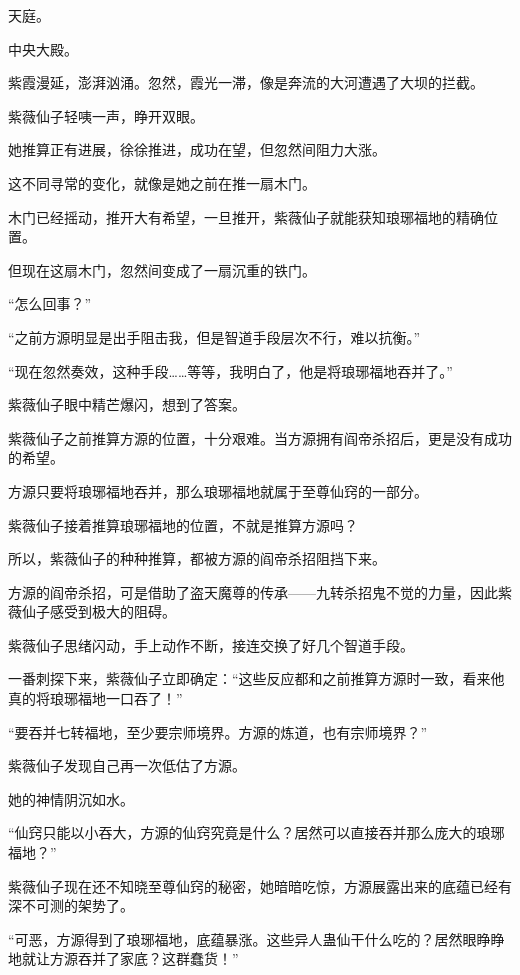 
\begin{this_body}



天庭。

中央大殿。

紫霞漫延，澎湃汹涌。忽然，霞光一滞，像是奔流的大河遭遇了大坝的拦截。

紫薇仙子轻咦一声，睁开双眼。

她推算正有进展，徐徐推进，成功在望，但忽然间阻力大涨。

这不同寻常的变化，就像是她之前在推一扇木门。

木门已经摇动，推开大有希望，一旦推开，紫薇仙子就能获知琅琊福地的精确位置。

但现在这扇木门，忽然间变成了一扇沉重的铁门。

“怎么回事？”

“之前方源明显是出手阻击我，但是智道手段层次不行，难以抗衡。”

“现在忽然奏效，这种手段……等等，我明白了，他是将琅琊福地吞并了。”

紫薇仙子眼中精芒爆闪，想到了答案。

紫薇仙子之前推算方源的位置，十分艰难。当方源拥有阎帝杀招后，更是没有成功的希望。

方源只要将琅琊福地吞并，那么琅琊福地就属于至尊仙窍的一部分。

紫薇仙子接着推算琅琊福地的位置，不就是推算方源吗？

所以，紫薇仙子的种种推算，都被方源的阎帝杀招阻挡下来。

方源的阎帝杀招，可是借助了盗天魔尊的传承——九转杀招鬼不觉的力量，因此紫薇仙子感受到极大的阻碍。

紫薇仙子思绪闪动，手上动作不断，接连交换了好几个智道手段。

一番刺探下来，紫薇仙子立即确定：“这些反应都和之前推算方源时一致，看来他真的将琅琊福地一口吞了！”

“要吞并七转福地，至少要宗师境界。方源的炼道，也有宗师境界？”

紫薇仙子发现自己再一次低估了方源。

她的神情阴沉如水。

“仙窍只能以小吞大，方源的仙窍究竟是什么？居然可以直接吞并那么庞大的琅琊福地？”

紫薇仙子现在还不知晓至尊仙窍的秘密，她暗暗吃惊，方源展露出来的底蕴已经有深不可测的架势了。

“可恶，方源得到了琅琊福地，底蕴暴涨。这些异人蛊仙干什么吃的？居然眼睁睁地就让方源吞并了家底？这群蠢货！”


\end{this_body}
